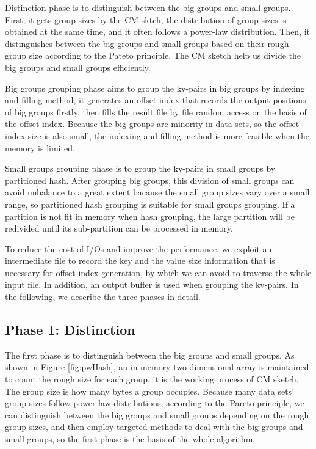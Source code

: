 Distinction phase is to distinguish between the big groups and small groups. First, it gets group sizes by the CM sktch, the distribution of group sizes is obtained at the same time, and it often follows a power-law distribution. Then, it distinguishes between the big groups and small groups based on their rough group size according to the Pateto principle. The CM sketch help us divide the big groups and small groups efficiently.

Big groups grouping phase aims to group the kv-pairs in big groups by indexing and filling method, it generates an offset index that records the output positions of big groups firstly, then fills the result file by file random access on the basis of the offset index. Because the big groups are minority in data sets, so the offset index size is also small, the indexing and filling method is more feasible when the memory is limited. 

Small groups grouping phase is to group the kv-pairs in small groups by partitioned hash. After grouping big groups, this division of small groups can avoid unbalance to a great extent bacause the small group sizes vary over a small range, so partitioned hash grouping is suitable for small groups grouping. If a partition is not fit in memory when hash grouping, the large partition will be redivided until its sub-partition can be processed in memory.

To reduce the cost of I/Os and improve the performance, we exploit an intermediate file to record the key and the value size information that is necessary for offset index generation, by which we can avoid to traverse the whole input file. In addition, an output buffer is used when grouping the kv-pairs. In the following, we describe the three phases in detail.

\subsection{Phase 1: Distinction}%

The first phase is to distinguish between the big groups and small groups. As shown in Figure \ref{fig:pwHash}, an in-memory two-dimensional array is maintained to count the rough size for each group, it is the working process of CM sketch. The group size is how many bytes a group occupies. Because many data sets' group sizes follow power-law distributions, according to the Pareto principle, we can distinguish between the big groups and small groups depending on the rough group sizes, and then employ targeted methods to deal with the big groups and small groups, so the first phase is the basis of the whole algorithm. 

